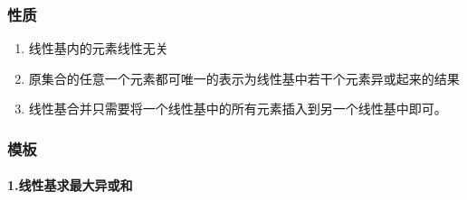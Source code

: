 \documentclass[
]{article}
\providecommand{\tightlist}{%
  \setlength{\itemsep}{0pt}\setlength{\parskip}{0pt}}
\begin{document}
\hypertarget{ux6027ux8d28-1}{%
\subsubsection{性质}\label{ux6027ux8d28-1}}

\begin{enumerate}
\def\labelenumi{\arabic{enumi}.}
\tightlist
\item
  线性基内的元素线性无关
\item
  原集合的任意一个元素都可唯一的表示为线性基中若干个元素异或起来的结果
\item
  线性基合并只需要将一个线性基中的所有元素插入到另一个线性基中即可。
\end{enumerate}

\hypertarget{ux6a21ux677f-11}{%
\subsubsection{模板}\label{ux6a21ux677f-11}}

\hypertarget{ux7ebfux6027ux57faux6c42ux6700ux5927ux5f02ux6216ux548c}{%
\paragraph{1.线性基求最大异或和}\label{ux7ebfux6027ux57faux6c42ux6700ux5927ux5f02ux6216ux548c}}
\end{document}
